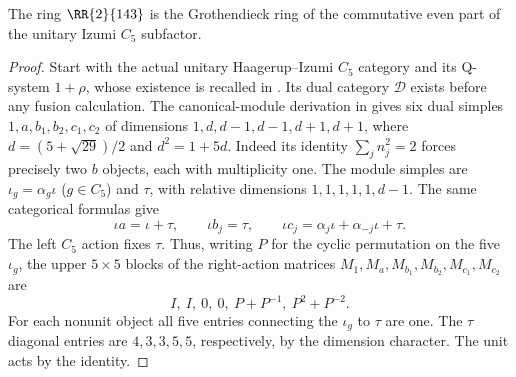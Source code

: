 \begin{proposition}\label{prop:Izumimodel}
The ring $\RR{2}{143}$ is the Grothendieck ring of the commutative even
part of the unitary Izumi $C_5$ subfactor.
\end{proposition}
\begin{proof}
Start with the actual unitary Haagerup--Izumi $C_5$ category and its
Q-system $1+\rho$, whose existence is recalled in \cite[Section~6]{GS}.
Its dual category $\mathcal D$ exists before any fusion calculation.
The canonical-module derivation in \cite[Section~7, equation~(7.1),
pp.~527--529]{Izumi3nAudit} gives six dual simples
$1,a,b_1,b_2,c_1,c_2$ of dimensions $1,d,d-1,d-1,d+1,d+1$,
where $d=(5+\sqrt{29})/2$ and $d^2=1+5d$.
Indeed its identity $\sum_j n_j^2=2$ forces precisely two $b$ objects,
each with multiplicity one. The module simples are
$\iota_g=\alpha_g\iota$ ($g\in C_5$) and $\tau$, with relative
dimensions $1,1,1,1,1,d-1$. The same categorical formulas give
\[
 \iota a=\iota+\tau,\qquad
 \iota b_j=\tau,\qquad
 \iota c_j=\alpha_j\iota+\alpha_{-j}\iota+\tau.
\]
The left $C_5$ action fixes $\tau$. Thus, writing $P$ for the cyclic
permutation on the five $\iota_g$, the upper $5\times5$ blocks of the
right-action matrices $M_1,M_a,M_{b_1},M_{b_2},M_{c_1},M_{c_2}$ are
\[
 I,\ I,\ 0,\ 0,\ P+P^{-1},\ P^2+P^{-2}.
\]
For each nonunit object all five entries connecting the $\iota_g$ to
$\tau$ are one. The $\tau$ diagonal entries are $4,3,3,5,5$, respectively,
by the dimension character. The unit acts by the identity.


\end{proof}
